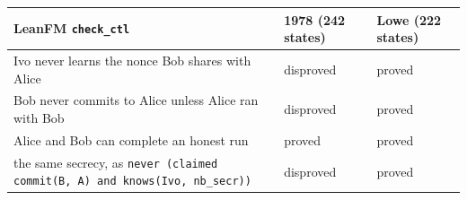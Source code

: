 \begin{tabular}{p{}ll}
\toprule
LeanFM \texttt{check\_ctl} & 1978 (242 states) & Lowe (222 states) \\
\midrule
Ivo never learns the nonce Bob shares with Alice & disproved & proved \\
Bob never commits to Alice unless Alice ran with Bob & disproved & proved \\
Alice and Bob can complete an honest run & proved & proved \\
the same secrecy, as \texttt{never (claimed commit(B, A) and knows(Ivo, nb\_secr))} & disproved & proved \\
\bottomrule
\end{tabular}
